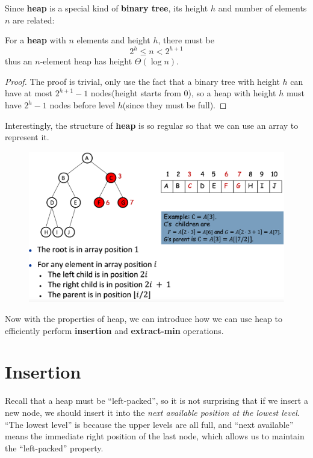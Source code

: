 \begin{spacing}{1.3}
    Since {\bf heap} is a special kind of {\bf binary tree}, its height $h$
    and number of elements $n$ are related:
    \begin{theorem}
        For a {\bf heap} with $n$ elements and height $h$, there must be 
        $$2^h\le n<2^{h+1}$$
        thus an $n$-element heap has height $\Theta(\log n)$.
    \end{theorem}
    \begin{proof}
        The proof is trivial, only use the fact that a binary tree with height $h$
        can have at most $2^{h+1}-1$ nodes(height starts from 0), so a heap with 
        height $h$ must have $2^h-1$ nodes before level $h$(since they must be full).
    \end{proof}

    Interestingly, the structure of {\bf heap} is so regular so that we can 
    use an array to represent it.
    \begin{figure}[htbp]
        \centering
        \includegraphics[scale=0.35]{images/05-heap-array.png}
    \end{figure}

    Now with the properties of heap, we can introduce how we can use heap to 
    efficiently perform {\bf insertion} and {\bf extract-min} operations.


    \vspace{0.3in}
    \section{Insertion}

    Recall that a heap must be ``left-packed'', so it is not surprising that 
    if we insert a new node, we should insert it into the {\it next available 
    position at the lowest level}. ``The lowest level'' is because the 
    upper levels are all full, and ``next available'' means the immediate 
    right position of the last node, which allows us to maintain the ``left-packed'' property.


\end{spacing}
